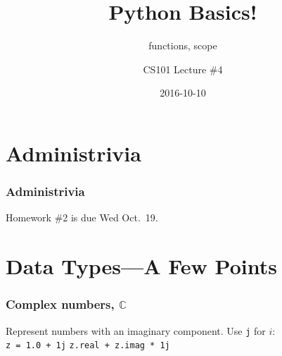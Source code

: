 \documentclass[11pt]{beamer}
\title{Python Basics!}
\subtitle{functions, scope}
\author{CS101 Lecture \#4}
\date{2016-10-10}
\begin{document}
  \setcounter{showProgressBar}{0}
  \setcounter{showSlideNumbers}{0}

\frame{\titlepage}

\setcounter{framenumber}{0}
\setcounter{showProgressBar}{1}
\setcounter{showSlideNumbers}{1}

\section{Administrivia}

\begin{frame}
  \frametitle{Administrivia}
  \Enlarge
  \begin{itemize}
  \myitem  Homework \#2 is due Wed Oct.\ 19. 
  \end{itemize}
\end{frame}

\section{Data Types---A Few Points}

\begin{frame}
  \frametitle{Complex numbers, $\mathbb{C}$}
  \Enlarge

  \begin{itemize}
  \myitem  Represent numbers with an imaginary component.
  \myitem  Use \texttt{j} for $i$: \\
    \textcolor{CS101GradBot}{\texttt{z = 1.0 + 1j}} \pause
  \myitem  \texttt{z.real + z.imag * 1j}
  \end{itemize}
\end{frame}
\end{document}

